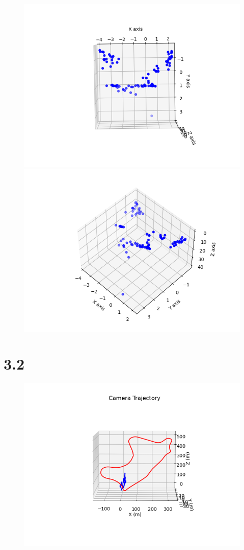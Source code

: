 \documentclass{article}
\begin{document}
    \begin{figure}[H]
        \centering
              \includegraphics[width=0.9\linewidth]{../homework/2_5_2_1.png}\\
              \includegraphics[width=0.9\linewidth]{../homework/2_5_2_2.png}

    \end{figure}
    
    \section*{3.2}
    
    \begin{figure}[H]
        \centering
              \includegraphics[width=0.9\linewidth]{../homework/3_2.png}
    \end{figure}

    
\end{document}
